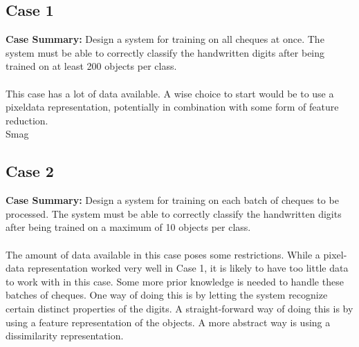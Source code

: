 \subsection{Case 1}
\label{sec:Case1}
\textbf{Case Summary:} Design a system for training on all cheques at once. The system must be able to correctly classify the handwritten digits after being trained on at least 200 objects per class.\\
\\
\noindent This case has a lot of data available. A wise choice to start would be to use a pixeldata representation, potentially in combination with some form of feature reduction. \\
Smag

\subsection{Case 2}
\label{sec:Case2}
\textbf{Case Summary:} Design a system for training on each batch of cheques to be processed. The system must be able to correctly classify the handwritten digits after being trained on a maximum of 10 objects per class.\\
\\
\noindent The amount of data available in this case poses some restrictions. While a pixel-data representation worked very well in Case 1, it is likely to have too little data to work with in this case. Some more prior knowledge is needed to handle these batches of cheques. One way of doing this is by letting the system recognize certain distinct properties of the digits. A straight-forward way of doing this is by using a feature representation of the objects. A more abstract way is using a dissimilarity representation.
\\
